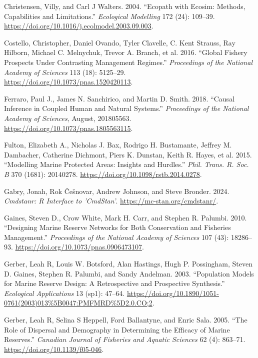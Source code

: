 \documentclass[
  default,
  lineno,
  referee]{sn-jnl}
\newlength{\cslhangindent}
\newenvironment{CSLReferences}[2] %
 {\begin{list}{}{%
  \setlength{\itemindent}{0pt}
  \setlength{\leftmargin}{0pt}
  \setlength{\parsep}{0pt}
  \ifodd #1
   \setlength{\leftmargin}{\cslhangindent}
   \setlength{\itemindent}{-1\cslhangindent}
  \fi
  \setlength{\itemsep}{#2\baselineskip}}}
 {\end{list}}
\begin{document}
\begin{CSLReferences}{1}{0}
Christensen, Villy, and Carl J Walters. 2004. {``Ecopath with Ecosim:
Methods, Capabilities and Limitations.''} \emph{Ecological Modelling}
172 (2{\textendash}4): 109--39.
\url{https://doi.org/10.1016/j.ecolmodel.2003.09.003}.

Costello, Christopher, Daniel Ovando, Tyler Clavelle, C. Kent Strauss,
Ray Hilborn, Michael C. Melnychuk, Trevor A. Branch, et al. 2016.
{``Global Fishery Prospects Under Contrasting Management Regimes.''}
\emph{Proceedings of the National Academy of Sciences} 113 (18):
5125--29. \url{https://doi.org/10.1073/pnas.1520420113}.

Ferraro, Paul J., James N. Sanchirico, and Martin D. Smith. 2018.
{``Causal Inference in Coupled Human and Natural Systems.''}
\emph{Proceedings of the National Academy of Sciences}, August,
201805563. \url{https://doi.org/10.1073/pnas.1805563115}.

Fulton, Elizabeth A., Nicholas J. Bax, Rodrigo H. Bustamante, Jeffrey M.
Dambacher, Catherine Dichmont, Piers K. Dunstan, Keith R. Hayes, et al.
2015. {``Modelling Marine Protected Areas: Insights and Hurdles.''}
\emph{Phil. Trans. R. Soc. B} 370 (1681): 20140278.
\url{https://doi.org/10.1098/rstb.2014.0278}.

Gabry, Jonah, Rok Češnovar, Andrew Johnson, and Steve Bronder. 2024.
\emph{Cmdstanr: R Interface to 'CmdStan'}.
\url{https://mc-stan.org/cmdstanr/}.

Gaines, Steven D., Crow White, Mark H. Carr, and Stephen R. Palumbi.
2010. {``Designing Marine Reserve Networks for Both Conservation and
Fisheries Management.''} \emph{Proceedings of the National Academy of
Sciences} 107 (43): 18286--93.
\url{https://doi.org/10.1073/pnas.0906473107}.

Gerber, Leah R, Louis W. Botsford, Alan Hastings, Hugh P. Possingham,
Steven D. Gaines, Stephen R. Palumbi, and Sandy Andelman. 2003.
{``Population Models for Marine Reserve Design: A Retrospective and
Prospective Synthesis.''} \emph{Ecological Applications} 13 (sp1):
47--64.
\url{https://doi.org/10.1890/1051-0761(2003)013\%5B0047:PMFMRD\%5D2.0.CO;2}.

Gerber, Leah R, Selina S Heppell, Ford Ballantyne, and Enric Sala. 2005.
{``The Role of Dispersal and Demography in Determining the Efficacy of
Marine Reserves.''} \emph{Canadian Journal of Fisheries and Aquatic
Sciences} 62 (4): 863--71. \url{https://doi.org/10.1139/f05-046}.


\end{CSLReferences}
\end{document}

